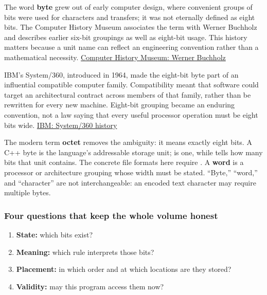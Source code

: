 \hypertarget{05-engine-i-ch001-a-short-historical-frame}{}

The word \textbf{byte} grew out of early computer design, where convenient groups of bits were used for characters and transfers; it was not eternally defined as eight bits. The Computer History Museum associates the term with Werner Buchholz and describes earlier six-bit groupings as well as eight-bit usage. This history matters because a unit name can reflect an engineering convention rather than a mathematical necessity. \href{https://www.computerhistory.org/tdih/october/24/}{Computer History Museum: Werner Buchholz}

IBM's System/360, introduced in 1964, made the eight-bit byte part of an influential compatible computer family. Compatibility meant that software could target an architectural contract across members of that family, rather than be rewritten for every new machine. Eight-bit grouping became an enduring convention, not a law saying that every useful processor operation must be eight bits wide. \href{https://www.ibm.com/history/system-360}{IBM: System/360 history}

The modern term \textbf{octet} removes the ambiguity: it means exactly eight bits. A C++ byte is the language's addressable storage unit;  is one, while  tells how many bits that unit contains. The concrete file formats here require . A \textbf{word} is a processor or architecture grouping whose width must be stated. ``Byte,'' ``word,'' and ``character'' are not interchangeable: an encoded text character may require multiple bytes.

\subsubsection{Four questions that keep the whole volume honest}\label{05-engine-i-ch001-four-questions-that-keep-the-whole-volume-honest}

\hypertarget{05-engine-i-ch001-four-questions-that-keep-the-whole-volume-honest}{}

\begin{enumerate}
\def\labelenumi{\arabic{enumi}.}
\tightlist
\item
  \textbf{State:} which bits exist?
\item
  \textbf{Meaning:} which rule interprets those bits?
\item
  \textbf{Placement:} in which order and at which locations are they stored?
\item
  \textbf{Validity:} may this program access them now?
\end{enumerate}

